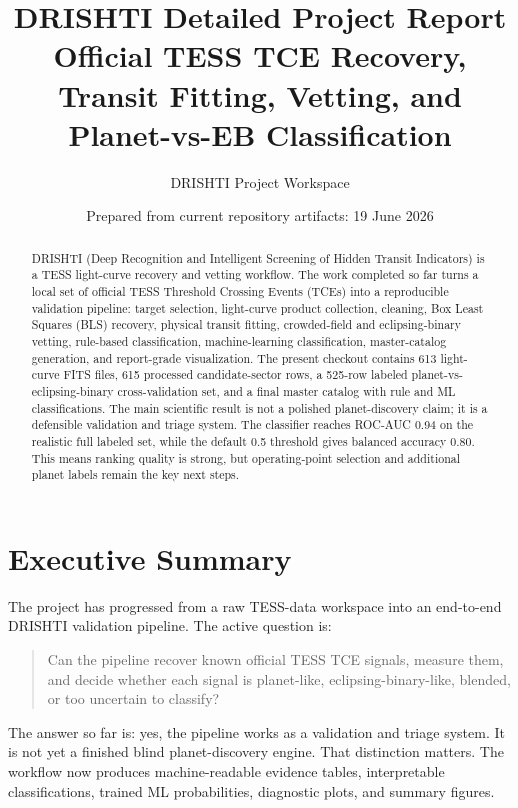 \documentclass[11pt,a4paper]{article}
\title{\textbf{DRISHTI Detailed Project Report}\\
\large Official TESS TCE Recovery, Transit Fitting, Vetting, and Planet-vs-EB Classification}
\author{DRISHTI Project Workspace}
\date{Prepared from current repository artifacts: 19 June 2026}
\begin{document}
\maketitle

\begin{abstract}
DRISHTI (Deep Recognition and Intelligent Screening of Hidden Transit Indicators) is a TESS light-curve recovery and vetting workflow. The work completed so far turns a local set of official TESS Threshold Crossing Events (TCEs) into a reproducible validation pipeline: target selection, light-curve product collection, cleaning, Box Least Squares (BLS) recovery, physical transit fitting, crowded-field and eclipsing-binary vetting, rule-based classification, machine-learning classification, master-catalog generation, and report-grade visualization. The present checkout contains 613 light-curve FITS files, 615 processed candidate-sector rows, a 525-row labeled planet-vs-eclipsing-binary cross-validation set, and a final master catalog with rule and ML classifications. The main scientific result is not a polished planet-discovery claim; it is a defensible validation and triage system. The classifier reaches ROC-AUC 0.94 on the realistic full labeled set, while the default 0.5 threshold gives balanced accuracy 0.80. This means ranking quality is strong, but operating-point selection and additional planet labels remain the key next steps.
\end{abstract}

\tableofcontents
\listoffigures
\listoftables
\newpage

\section{Executive Summary}

The project has progressed from a raw TESS-data workspace into an end-to-end DRISHTI validation pipeline. The active question is:

\begin{quote}
Can the pipeline recover known official TESS TCE signals, measure them, and decide whether each signal is planet-like, eclipsing-binary-like, blended, or too uncertain to classify?
\end{quote}

\noindent The answer so far is: yes, the pipeline works as a validation and triage system. It is not yet a finished blind planet-discovery engine. That distinction matters. The workflow now produces machine-readable evidence tables, interpretable classifications, trained ML probabilities, diagnostic plots, and summary figures.
\end{document}
